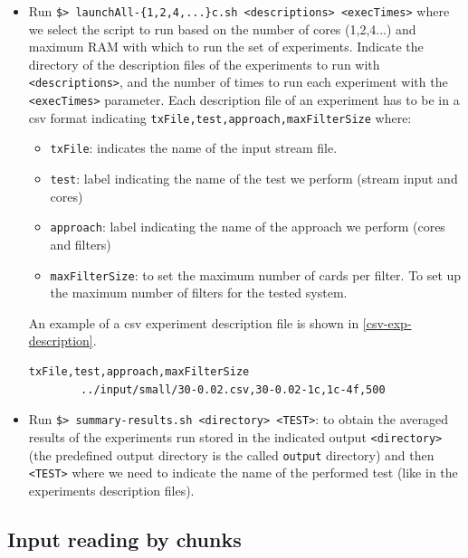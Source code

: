 \documentclass[12pt,a4paper]{article}
\begin{document}
\begin{itemize}
    \item Run \texttt{\$> launchAll-\{1,2,4,...\}c.sh <descriptions> <execTimes>} where we select the script to run based on the number of cores (1,2,4...) and maximum RAM with which to run the set of experiments. Indicate the directory of the description files of the experiments to run with \texttt{<descriptions>}, and the number of times to run each experiment with the \texttt{<execTimes>} parameter.
    Each description file of an experiment has to be in a csv format indicating \texttt{txFile,test,approach,maxFilterSize} where:
    \begin{itemize}
        \item \texttt{txFile}: indicates the name of the input stream file.
        \item \texttt{test}: label indicating the name of the test we perform (stream input and cores)
        \item \texttt{approach}: label indicating the name of the approach we perform (cores and filters)
        \item \texttt{maxFilterSize}: to set the maximum number of cards per filter. To set up the maximum number of filters for the tested system.
    \end{itemize}
    An example of a csv experiment description file is shown in \ref{csv-exp-description}.
    \begin{center}
    \lstset{style=cypherStyle}
    \begin{lstlisting}[caption={30-0.02-1c-4f}, label={csv-exp-description}]
        txFile,test,approach,maxFilterSize
        ../input/small/30-0.02.csv,30-0.02-1c,1c-4f,500
    \end{lstlisting}
    \end{center}
    \item Run \texttt{\$> summary-results.sh <directory> <TEST>}: to obtain the averaged results of the experiments run stored in the indicated output \texttt{<directory>} (the predefined output directory is the called \texttt{output} directory) and then \texttt{<TEST>} where we need to indicate the name of the performed test (like in the experiments description files).
\end{itemize}



\subsection{Input reading by chunks}\label{exps-input-reading}
\end{document}
